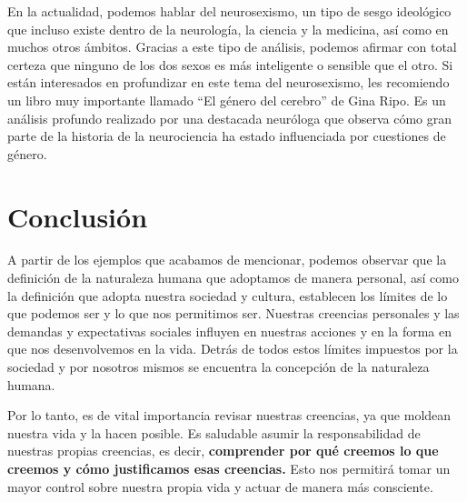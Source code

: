 \documentclass[
  letterpaper,
  DIV=11,
  numbers=noendperiod]{scrartcl}
\begin{document}
En la actualidad, podemos hablar del neurosexismo, un tipo de sesgo
ideológico que incluso existe dentro de la neurología, la ciencia y la
medicina, así como en muchos otros ámbitos. Gracias a este tipo de
análisis, podemos afirmar con total certeza que ninguno de los dos sexos
es más inteligente o sensible que el otro. Si están interesados en
profundizar en este tema del neurosexismo, les recomiendo un libro muy
importante llamado ``El género del cerebro'' de Gina Ripo. Es un
análisis profundo realizado por una destacada neuróloga que observa cómo
gran parte de la historia de la neurociencia ha estado influenciada por
cuestiones de género.

\hypertarget{conclusiuxf3n}{%
\section{Conclusión}\label{conclusiuxf3n}}

A partir de los ejemplos que acabamos de mencionar, podemos observar que
la definición de la naturaleza humana que adoptamos de manera personal,
así como la definición que adopta nuestra sociedad y cultura, establecen
los límites de lo que podemos ser y lo que nos permitimos ser. Nuestras
creencias personales y las demandas y expectativas sociales influyen en
nuestras acciones y en la forma en que nos desenvolvemos en la vida.
Detrás de todos estos límites impuestos por la sociedad y por nosotros
mismos se encuentra la concepción de la naturaleza humana.

Por lo tanto, es de vital importancia revisar nuestras creencias, ya que
moldean nuestra vida y la hacen posible. Es saludable asumir la
responsabilidad de nuestras propias creencias, es decir,
\textbf{comprender por qué creemos lo que creemos y cómo justificamos
esas creencias.} Esto nos permitirá tomar un mayor control sobre nuestra
propia vida y actuar de manera más consciente.


\printbibliography
\end{document}
